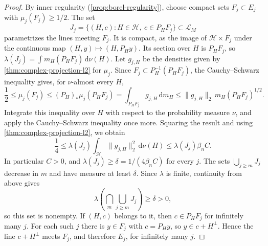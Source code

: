 \begin{proof}
By inner regularity (\cref{prop:borel-regularity}), choose compact sets $F_j\subset E_j$ with $\mu_j(F_j)\geq1/2$. The set
\[
 J_j=\{(H,c):H\in\mathcal H,\ c\in P_HF_j\}\subset\mathcal L_M
\]
parametrizes the lines meeting $F_j$. It is compact, as the image of $\mathcal H\times F_j$ under the continuous map $(H,y)\mapsto(H,P_Hy)$. Its section over $H$ is $P_HF_j$, so $\lambda(J_j)=\int m_H(P_HF_j)\,\mathrm d\nu(H)$. Let $g_{j,H}$ be the densities given by \cref{thm:complex-projection-l2} for $\mu_j$. Since $F_j\subset P_H^{-1}(P_HF_j)$, the Cauchy--Schwarz inequality gives, for $\nu$-almost every $H$,
\[
 \frac12\leq\mu_j(F_j)\leq(P_H)_*\mu_j(P_HF_j)=\int_{P_HF_j}g_{j,H}\,\mathrm d m_H
 \leq\|g_{j,H}\|_2\,m_H(P_HF_j)^{1/2}.
\]
Integrate this inequality over $H$ with respect to the probability measure $\nu$, and apply the Cauchy--Schwarz inequality once more. Squaring the result and using \cref{thm:complex-projection-l2}, we obtain
\[
 \frac14\leq\lambda(J_j)\int_{\mathcal H}\|g_{j,H}\|_2^2\,\mathrm d\nu(H)
 \leq\lambda(J_j)\beta_n C.
\]
In particular $C>0$, and $\lambda(J_j)\geq\delta=1/(4\beta_n C)$ for every $j$. The sets $\bigcup_{j\geq m}J_j$ decrease in $m$ and have measure at least $\delta$. Since $\lambda$ is finite, continuity from above gives
\[
 \lambda\left(\bigcap_m\bigcup_{j\geq m}J_j\right)\geq\delta>0,
\]
so this set is nonempty. If $(H,c)$ belongs to it, then $c\in P_HF_j$ for infinitely many $j$. For each such $j$ there is $y\in F_j$ with $c=P_Hy$, so $y\in c+H^\perp$. Hence the line $c+H^\perp$ meets $F_j$, and therefore $E_j$, for infinitely many $j$.
\end{proof}

